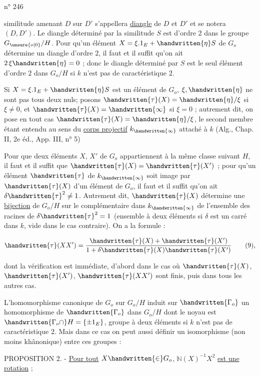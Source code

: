 
n° 246

similitude amenant $D$ sur $D'$ s'appellera  \uline{diangle} de $D$ et $D'$ et se notera $(D,D')$. Le diangle déterminé par la similitude $S$ est d'ordre $2$ dans le groupe $G_{\unsure{o|0}}/H$. Pour qu'un élément $X=\xi.1_E+\handwritten{\eta} S$ de $G_o$ détermine un diangle d'ordre $2$, il faut et il suffit qu'on ait $2\,\xi\handwritten{\eta}=0$ ; donc le diangle déterminé par $S$ est le seul élément d'ordre $2$ dans $G_o/H$ si $k$ n'est pas de caractéristique $2$.

Si $X=\xi.1_E+\handwritten{\eta} S$ est un élément de $G_o$, $\xi,\handwritten{\eta}$ ne sont pas tous deux nuls; posons $\handwritten{\tau}(X)=\handwritten{\eta}/\xi$ si $\xi\ne0$, et $\handwritten{\tau}(X)=\handwritten{\infty}$ si $\xi=0$ ; autrement dit, on pose en tout cas $\handwritten{\tau}(X)=\handwritten{\eta}/\xi$, le second membre étant entendu au sens du \uline{corps projectif} $k_{\handwritten{\infty}}$ attaché à $k$ (Alg., Chap. II, 2e éd., App. III, n° 5)

Pour que deux éléments $X$, $X'$ de $G_o$ appartiennent à la même classe suivant $H$, il faut et il suffit que $\handwritten{\tau}(X)=\handwritten{\tau}(X')$ ; pour qu'un élément $\handwritten{\tau}$ de $k_{\handwritten{\infty}}$ soit image par $\handwritten{\tau}(X)$ d'un élément de $G_o$, il faut et il suffit qu'on ait $\delta\handwritten{\tau}^2\ne1$. Autrement dit, $\handwritten{\tau}(X)$ détermine une \uline{bijection} de $G_o/H$ sur le complémentaire dans $k_{\handwritten{\infty}}$ de l'ensemble des racines de $\delta\handwritten{\tau}^2=1$ (ensemble à deux éléments si $\delta$ est un carré dans $k$, vide dans le cas contraire). On a la formule :

\[
\handwritten{\tau}(XX')=\frac{\handwritten{\tau}(X)+\handwritten{\tau}(X')}{1+\delta\handwritten{\tau}(X)\handwritten{\tau}(X')}\tag*{(9),}
\]

dont la vérification est immédiate, d'abord dans le cas où $\handwritten{\tau}(X)$, $\handwritten{\tau}(X')$, $\handwritten{\tau}(XX')$ sont finis, puis dans tous les autres cas.

L'homomorphisme canonique de $G_o$ sur $G_o/H$ induit sur $\handwritten{\Gamma_o}$ un homomorphisme de $\handwritten{\Gamma_o}$ dans $G_o/H$ dont le noyau est $\handwritten{\Gamma_o\cap} H=\{\pm1_E\}$, groupe à deux éléments si $k$ n'est pas de caractéristique $2$. Mais dans ce cas on peut aussi définir un isomorphisme (non moins khânonique) entre ces groupes :

PROPOSITION 2. - \uline{Pour tout} $X\handwritten{\in}G_o$, $\mathbb{N}(X)^{-1}X^2$ \uline{est une rotation} ;


